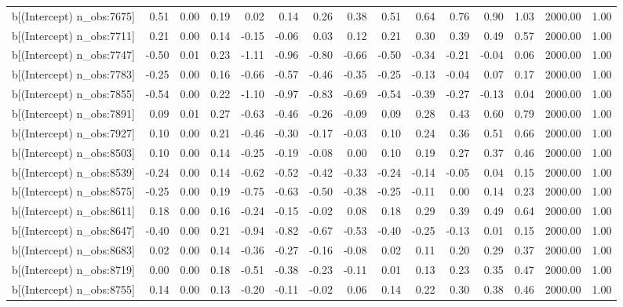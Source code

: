 \begin{table}[ht]
\begin{tabular}{rrrrrrrrrrrrrrr}
  b[(Intercept) n\_obs:7675] & 0.51 & 0.00 & 0.19 & 0.02 & 0.14 & 0.26 & 0.38 & 0.51 & 0.64 & 0.76 & 0.90 & 1.03 & 2000.00 & 1.00 \\ 
  b[(Intercept) n\_obs:7711] & 0.21 & 0.00 & 0.14 & -0.15 & -0.06 & 0.03 & 0.12 & 0.21 & 0.30 & 0.39 & 0.49 & 0.57 & 2000.00 & 1.00 \\ 
  b[(Intercept) n\_obs:7747] & -0.50 & 0.01 & 0.23 & -1.11 & -0.96 & -0.80 & -0.66 & -0.50 & -0.34 & -0.21 & -0.04 & 0.06 & 2000.00 & 1.00 \\ 
  b[(Intercept) n\_obs:7783] & -0.25 & 0.00 & 0.16 & -0.66 & -0.57 & -0.46 & -0.35 & -0.25 & -0.13 & -0.04 & 0.07 & 0.17 & 2000.00 & 1.00 \\ 
  b[(Intercept) n\_obs:7855] & -0.54 & 0.00 & 0.22 & -1.10 & -0.97 & -0.83 & -0.69 & -0.54 & -0.39 & -0.27 & -0.13 & 0.04 & 2000.00 & 1.00 \\ 
  b[(Intercept) n\_obs:7891] & 0.09 & 0.01 & 0.27 & -0.63 & -0.46 & -0.26 & -0.09 & 0.09 & 0.28 & 0.43 & 0.60 & 0.79 & 2000.00 & 1.00 \\ 
  b[(Intercept) n\_obs:7927] & 0.10 & 0.00 & 0.21 & -0.46 & -0.30 & -0.17 & -0.03 & 0.10 & 0.24 & 0.36 & 0.51 & 0.66 & 2000.00 & 1.00 \\ 
  b[(Intercept) n\_obs:8503] & 0.10 & 0.00 & 0.14 & -0.25 & -0.19 & -0.08 & 0.00 & 0.10 & 0.19 & 0.27 & 0.37 & 0.46 & 2000.00 & 1.00 \\ 
  b[(Intercept) n\_obs:8539] & -0.24 & 0.00 & 0.14 & -0.62 & -0.52 & -0.42 & -0.33 & -0.24 & -0.14 & -0.05 & 0.04 & 0.15 & 2000.00 & 1.00 \\ 
  b[(Intercept) n\_obs:8575] & -0.25 & 0.00 & 0.19 & -0.75 & -0.63 & -0.50 & -0.38 & -0.25 & -0.11 & 0.00 & 0.14 & 0.23 & 2000.00 & 1.00 \\ 
  b[(Intercept) n\_obs:8611] & 0.18 & 0.00 & 0.16 & -0.24 & -0.15 & -0.02 & 0.08 & 0.18 & 0.29 & 0.39 & 0.49 & 0.64 & 2000.00 & 1.00 \\ 
  b[(Intercept) n\_obs:8647] & -0.40 & 0.00 & 0.21 & -0.94 & -0.82 & -0.67 & -0.53 & -0.40 & -0.25 & -0.13 & 0.01 & 0.15 & 2000.00 & 1.00 \\ 
  b[(Intercept) n\_obs:8683] & 0.02 & 0.00 & 0.14 & -0.36 & -0.27 & -0.16 & -0.08 & 0.02 & 0.11 & 0.20 & 0.29 & 0.37 & 2000.00 & 1.00 \\ 
  b[(Intercept) n\_obs:8719] & 0.00 & 0.00 & 0.18 & -0.51 & -0.38 & -0.23 & -0.11 & 0.01 & 0.13 & 0.23 & 0.35 & 0.47 & 2000.00 & 1.00 \\ 
  b[(Intercept) n\_obs:8755] & 0.14 & 0.00 & 0.13 & -0.20 & -0.11 & -0.02 & 0.06 & 0.14 & 0.22 & 0.30 & 0.38 & 0.46 & 2000.00 & 1.00 \\ 

\end{tabular}
\end{table}
